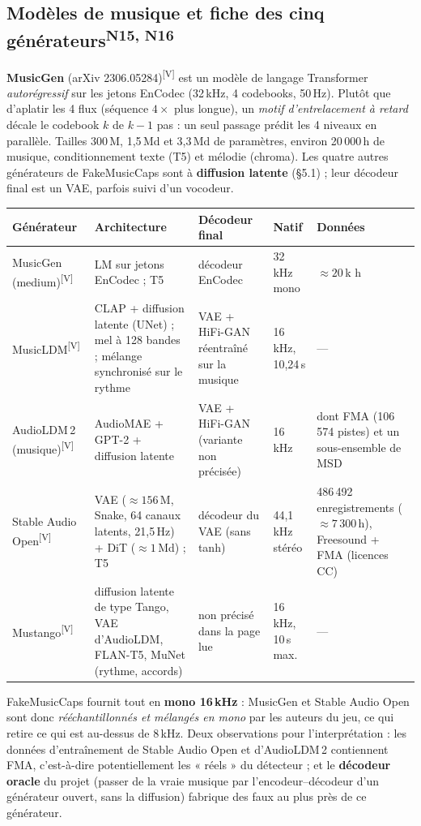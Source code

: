 \documentclass[10pt,a4paper]{article}
\newcommand{\sV}{\textsuperscript{\scriptsize\textcolor{green!40!black}{[V]}}}
\newcommand{\nref}[1]{\textsuperscript{\scriptsize\textcolor{black!55}{#1}}}
\begin{document}
\subsection{Modèles de musique et fiche des cinq générateurs\nref{N15, N16}}
\textbf{MusicGen} (arXiv 2306.05284)\sV{} est un modèle de langage Transformer \emph{autorégressif} sur les jetons EnCodec (32\,kHz, 4 codebooks, 50\,Hz). Plutôt que d'aplatir les 4 flux (séquence $4\times$ plus longue), un \emph{motif d'entrelacement à retard} décale le codebook $k$ de $k{-}1$ pas : un seul passage prédit les 4 niveaux en parallèle. Tailles 300\,M, 1,5\,Md et 3,3\,Md de paramètres, environ 20\,000\,h de musique, conditionnement texte (T5) et mélodie (chroma). Les quatre autres générateurs de FakeMusicCaps sont à \textbf{diffusion latente} (§5.1) ; leur décodeur final est un VAE, parfois suivi d'un vocodeur.

\begin{center}\footnotesize
\begin{tabularx}{\textwidth}{@{}L{2.1cm}L{4.6cm}L{3.5cm}L{1.9cm}X@{}}
\toprule
\textbf{Générateur} & \textbf{Architecture} & \textbf{Décodeur final} & \textbf{Natif} & \textbf{Données}\\
\midrule
MusicGen (medium)\sV & LM sur jetons EnCodec ; T5 & décodeur EnCodec & 32\,kHz mono & $\ensuremath{\approx}20$\,k h\\
MusicLDM\sV & CLAP + diffusion latente (UNet) ; mel à 128 bandes ; mélange synchronisé sur le rythme & VAE + HiFi-GAN réentraîné sur la musique & 16\,kHz, 10,24\,s & ---\\
AudioLDM\,2 (musique)\sV & AudioMAE + GPT-2 + diffusion latente & VAE + HiFi-GAN (variante non précisée) & 16\,kHz & dont FMA (106\,574 pistes) et un sous-ensemble de MSD\\
Stable Audio Open\sV & VAE ($\ensuremath{\approx}156$\,M, Snake, 64 canaux latents, 21,5\,Hz) + DiT ($\ensuremath{\approx}1$\,Md) ; T5 & décodeur du VAE (sans tanh) & 44,1\,kHz stéréo & 486\,492 enregistrements ($\ensuremath{\approx}7\,300$\,h), Freesound + FMA (licences CC)\\
Mustango\sV & diffusion latente de type Tango, VAE d'AudioLDM, FLAN-T5, MuNet (rythme, accords) & non précisé dans la page lue & 16\,kHz, 10\,s max. & ---\\
\bottomrule
\end{tabularx}
\end{center}
FakeMusicCaps fournit tout en \textbf{mono 16\,kHz} : MusicGen et Stable Audio Open sont donc \emph{rééchantillonnés et mélangés en mono} par les auteurs du jeu, ce qui retire ce qui est au-dessus de 8\,kHz. Deux observations pour l'interprétation : les données d'entraînement de Stable Audio Open et d'AudioLDM\,2 contiennent FMA, c'est-à-dire potentiellement les « réels » du détecteur ; et le \textbf{décodeur oracle} du projet (passer de la vraie musique par l'encodeur--décodeur d'un générateur ouvert, sans la diffusion) fabrique des faux au plus près de ce générateur.
\end{document}
